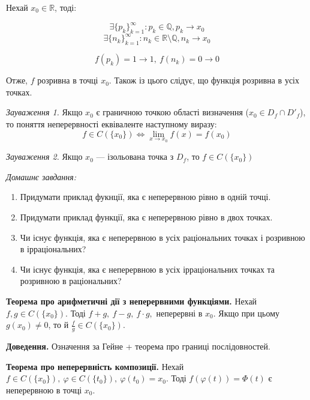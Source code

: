 \documentclass[12pt]{report}
\begin{document}
Нехай $x_0 \in \mathbb{R}$, тоді:

$$\exists \{ p_k\}_{k=1}^{\infty} : p_k \in \mathbb{Q}, p_k \to x_0$$
$$\exists \{ n_k\}_{k=1}^{\infty} : n_k \in \mathbb{R}\setminus \mathbb{Q}, n_k \to x_0$$

$$f(p_k) = 1 \to 1,\ f(n_k) = 0 \to 0$$

Отже, $f$ розривна в точці $x_0$. Також із цього слідує, що функція розривна в усіх точках.

\vspace{3mm}

\textit{Зауваження 1.} Якщо $x_0$ є граничною точкою області визначення ($x_0 \in D_f \cap D'_f$), то поняття неперервності еквіваленте наступному виразу:
$$f \in C(\{ x_0\}) \Longleftrightarrow \lim_{x\to x_0}f(x) = f(x_0)$$

\textit{Зауваження 2.} Якщо $x_0$ --- ізольована точка з $D_f$, то $f \in C(\{ x_0 \})$

\vspace{3mm}

\textit{Домашнє завдання:}

\begin{enumerate}
    \item Придумати приклад фукнції, яка є неперервною рівно в одній точці.
    \item Придумати приклад функції, яка є неперервною рівно в двох точках.
    \item Чи існує функція, яка є неперервною в усіх раціональних точках і розривною в ірраціональних?
    \item Чи існує функція, яка є неперервною в усіх ірраціональних точках та розривною в раціональних?
\end{enumerate}

\vspace{5mm}

\textbf{Теорема про арифметичні дії з неперервними функціями.} Нехай $f, g \in C(\{ x_0 \}).$ Тоді $f + g,\ f-g,\ f\cdot g,$ неперервні в $x_0$. Якщо при цьому $g(x_0) \neq 0$, то  й $\frac{f}{g} \in C(\{ x_0 \})$.

\textbf{Доведення.} Означення за Гейне + теорема про границі послідовностей.

\vspace{5mm}

\textbf{Теорема про неперервність композиції.} Нехай $f \in C(\{ x_0 \}),\ \varphi \in C(\{ t_0\}),\ \varphi(t_0) = x_0$. Тоді $f(\varphi (t)) = \Phi (t)$ є неперервною в точці $x_0$.
\end{document}
